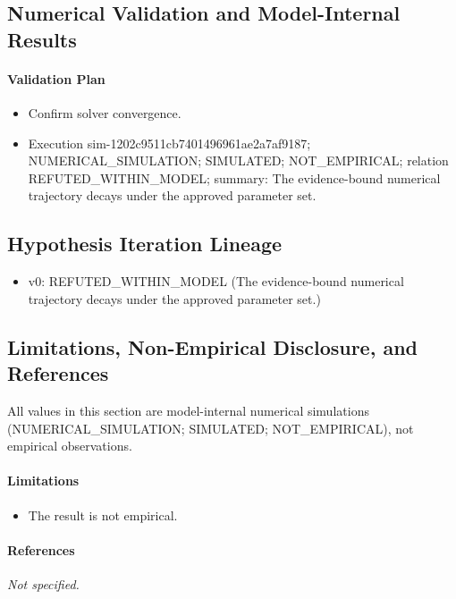 \documentclass[11pt]{article}
\begin{document}
\subsection{Numerical Validation and Model-Internal Results}

\paragraph{Validation Plan}
\begin{itemize}\raggedright
\item Confirm solver convergence.
\end{itemize}

\begin{itemize}
\item Execution sim-1202c9511cb7401496961ae2a7af9187; NUMERICAL\_SIMULATION; SIMULATED; NOT\_EMPIRICAL; relation REFUTED\_WITHIN\_MODEL; summary: The evidence-bound numerical trajectory decays under the approved parameter set.
\end{itemize}

\subsection{Hypothesis Iteration Lineage}

\begin{itemize}\raggedright
\item v0: REFUTED\_\allowbreak{}WITHIN\_\allowbreak{}MODEL (The evidence-bound numerical trajectory decays under the approved parameter set.)
\end{itemize}

\subsection{Limitations, Non-Empirical Disclosure, and References}

\noindent All values in this section are model-internal numerical simulations (NUMERICAL\_SIMULATION; SIMULATED; NOT\_EMPIRICAL), not empirical observations.

\paragraph{Limitations}
\begin{itemize}\raggedright
\item The result is not empirical.
\end{itemize}

\paragraph{References}
\emph{Not specified.}
\end{document}
